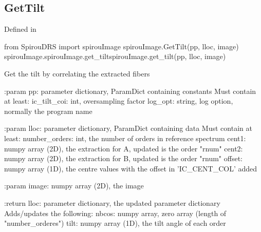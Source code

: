 \noindent\begin{minipage}{\textwidth}
\subsection{GetTilt}

Defined in \spirouImage{}

\begin{pythonbox}
from SpirouDRS import spirouImage
spirouImage.GetTilt(pp, lloc, image)
spirouImage.spirouImage.get_tiltspirouImage.get_tilt(pp, lloc, image)
\end{pythonbox}

\begin{pythondocstring}
Get the tilt by correlating the extracted fibers

:param pp: parameter dictionary, ParamDict containing constants
    Must contain at least:
            ic_tilt_coi: int, oversampling factor
            log_opt: string, log option, normally the program name

:param lloc: parameter dictionary, ParamDict containing data
        Must contain at least:
            number_orders: int, the number of orders in reference spectrum
            cent1: numpy array (2D), the extraction for A, updated is
                   the order "rnum"
            cent2: numpy array (2D), the extraction for B, updated is
                   the order "rnum"
            offset: numpy array (1D), the centre values with the
                    offset in 'IC_CENT_COL' added

:param image: numpy array (2D), the image

:return lloc: parameter dictionary, the updated parameter dictionary
        Adds/updates the following:
            nbcos: numpy array, zero array  (length of "number_orderes")
            tilt: numpy array (1D), the tilt angle of each order
\end{pythondocstring}
\end{minipage}


